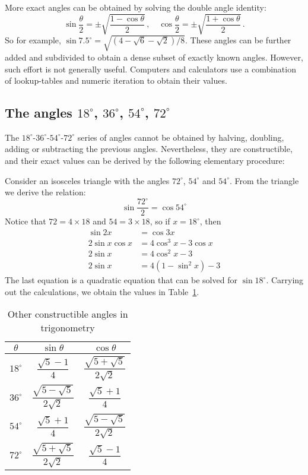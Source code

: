 \documentclass[12pt]{article}
\begin{document}
More exact angles can be obtained by solving the double angle identity:
\[
\sin \frac{\theta}{2} =\pm\sqrt{\frac{1-\cos \theta}{2}}\,, \quad 
\cos \frac{\theta}{2} =\pm\sqrt{\frac{1+\cos \theta}{2}}\,.
\]
So for example, $\sin{7.5^\circ}=\sqrt{(4-\sqrt{6}-\sqrt{2})/8}$.  These angles can be further added and subdivided to obtain a dense subset of exactly known angles.  However, such effort is not generally useful.  Computers and calculators use a combination of lookup-tables and numeric iteration to obtain their values.

\subsection{The angles $18^\circ$, $36^\circ$, $54^\circ$, $72^\circ$}

The $18^\circ$-$36^\circ$-$54^\circ$-$72^\circ$ series of angles cannot be obtained
by halving, doubling, adding or subtracting the previous angles.  Nevertheless, they are constructible, and their exact values can be derived by the following elementary procedure:

Consider an isosceles triangle with the angles $72^\circ$, $54^\circ$ and $54^\circ$.  
From the triangle we derive the relation:
\[
\sin \frac{72^\circ}{2} = \cos 54^\circ
\]
Notice that $72=4 \times 18$ and $54 = 3\times 18$, so if $x = 18^\circ$,
then
\begin{align*}
\sin 2x &= \cos 3x \\
2 \sin x \cos x &= 4 \cos^3 x - 3 \cos x \\
2 \sin x &= 4 \cos^2 x - 3 \\
2 \sin x &= 4 (1-\sin^2 x) -3 
\end{align*}
The last equation is a quadratic equation that can be solved for $\sin 18^\circ$.  Carrying out the calculations, we obtain the values in Table~\ref{table: eighteen degrees}.

\begin{table}
\caption{Other constructible angles in trigonometry}
\label{table: eighteen degrees}
\begin{tabular}{| c | c | c |}
\hline
$\theta$ &$\sin \theta $ &$\cos \theta $ \\
\hline
$18^\circ$ & $\dfrac{\sqrt{5}-1}{4}$ & $\dfrac{\sqrt{5 + \sqrt{5}}}{2\sqrt{2}}$  \\
$36^\circ$ & $\dfrac{\sqrt{5-\sqrt{5}}}{2\sqrt{2}}$ & $\dfrac{\sqrt{5}+1}{4}$ \\
$54^\circ$ & $\dfrac{\sqrt{5}+1}{4}$ & $\dfrac{\sqrt{5-\sqrt{5}}}{2\sqrt{2}}$  \\
$72^\circ$ & $\dfrac{\sqrt{5+\sqrt{5}}}{2\sqrt{2}}$ & $\dfrac{\sqrt{5}-1}{4}$ \\
\hline
\end{tabular}
\end{table}


\end{document}
